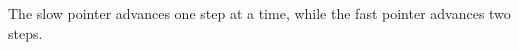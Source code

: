 \documentclass[preview]{standalone}
\begin{document}
The slow pointer advances one step at a time, while the fast pointer advances two steps.\\
\end{document}
